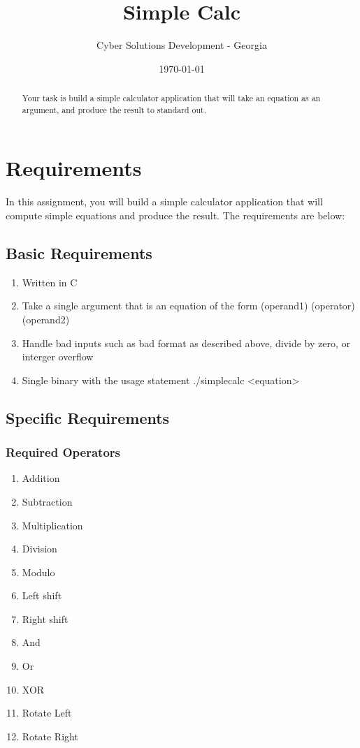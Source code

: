 \documentclass[letterpaper,12pt]{article}
\begin{document}
	
	\title{Simple Calc}
	\author{Cyber Solutions Development - Georgia}
	\date{\today}
	\maketitle
	
	\begin{abstract}
		Your task is build a simple calculator application that will take an equation as an argument, and produce the result to standard out.
	\end{abstract}
	
	
	\section{Requirements}
	
	In this assignment, you will build a simple calculator application that will compute simple equations and produce the result. The requirements are below:
	
	\subsection{Basic Requirements}
		\begin{enumerate}
			\item Written in C
			\item Take a single argument that is an equation of the form (operand1) (operator) (operand2)
			\item Handle bad inputs such as bad format as described above, divide by zero, or interger overflow
			\item Single binary with the usage statement ./simplecalc <equation>
		\end{enumerate}
	
	\subsection{Specific Requirements}
	\subsubsection{Required Operators}
		\begin{enumerate}
			\item Addition 
			\item Subtraction
			\item Multiplication
			\item Division
			\item Modulo 
			\item Left shift 
			\item Right shift 
			\item And
			\item Or
			\item XOR
			\item Rotate Left
			\item Rotate Right
		\end{enumerate}
	
\end{document}
